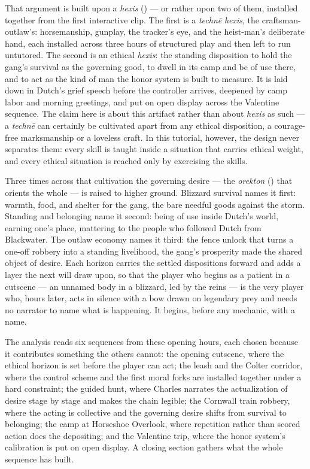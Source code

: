 That argument is built upon a \textit{hexis} () — or rather upon two of them, installed together from the first interactive clip. The first is a \textit{technē} \textit{hexis}, the craftsman-outlaw's: horsemanship, gunplay, the tracker's eye, and the heist-man's deliberate hand, each installed across three hours of structured play and then left to run untutored. The second is an ethical \textit{hexis}: the standing disposition to hold the gang's survival as the governing good, to dwell in its camp and be of use there, and to act as the kind of man the honor system is built to measure. It is laid down in Dutch's grief speech before the controller arrives, deepened by camp labor and morning greetings, and put on open display across the Valentine sequence. The claim here is about this artifact rather than about \textit{hexis} as such — a \textit{technē} can certainly be cultivated apart from any ethical disposition, a courage-free marksmanship or a loveless craft. In this tutorial, however, the design never separates them: every skill is taught inside a situation that carries ethical weight, and every ethical situation is reached only by exercising the skills.

Three times across that cultivation the governing desire — the \textit{orekton} () that orients the whole — is raised to higher ground. Blizzard survival names it first: warmth, food, and shelter for the gang, the bare needful goods against the storm. Standing and belonging name it second: being of use inside Dutch's world, earning one's place, mattering to the people who followed Dutch from Blackwater. The outlaw economy names it third: the fence unlock that turns a one-off robbery into a standing livelihood, the gang's prosperity made the shared object of desire. Each horizon carries the settled dispositions forward and adds a layer the next will draw upon, so that the player who begins as a patient in a cutscene — an unnamed body in a blizzard, led by the reins — is the very player who, hours later, acts in silence with a bow drawn on legendary prey and needs no narrator to name what is happening. It begins, before any mechanic, with a name.

The analysis reads six sequences from these opening hours, each chosen because it contributes something the others cannot: the opening cutscene, where the ethical horizon is set before the player can act; the leash and the Colter corridor, where the control scheme and the first moral forks are installed together under a hard constraint; the guided hunt, where Charles narrates the actualization of desire stage by stage and makes the chain legible; the Cornwall train robbery, where the acting is collective and the governing desire shifts from survival to belonging; the camp at Horseshoe Overlook, where repetition rather than scored action does the depositing; and the Valentine trip, where the honor system's calibration is put on open display. A closing section gathers what the whole sequence has built.

